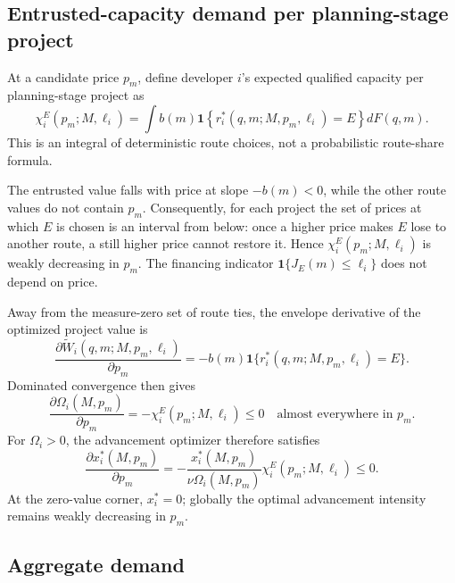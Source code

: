 \subsection{Entrusted-capacity demand per planning-stage project}
\label{subsec:p06-project-demand}

At a candidate price \(p_m\), define developer \(i\)'s expected qualified
capacity per planning-stage project as
\begin{equation}
  \chi_i^E(p_m;M,\ell_i)
  =
  \int
  b(m)
  \mathbf 1
  \left\{
    r_i^*(q,m;M,p_m,\ell_i)=E
  \right\}
  dF(q,m).
  \label{eq:p06-entrusted-capacity}
\end{equation}
This is an integral of deterministic route choices, not a probabilistic
route-share formula.

The entrusted value falls with price at slope \(-b(m)<0\), while the other
route values do not contain \(p_m\). Consequently, for each project the set
of prices at which \(E\) is chosen is an interval from below: once a higher
price makes \(E\) lose to another route, a still higher price cannot restore
it. Hence \(\chi_i^E(p_m;M,\ell_i)\) is weakly decreasing in \(p_m\).
The financing indicator \(\mathbf 1\{J_E(m)\leq\ell_i\}\) does not depend on
price.

Away from the measure-zero set of route ties, the envelope derivative of the
optimized project value is
\[
  \frac{\partial \widetilde W_i(q,m;M,p_m,\ell_i)}{\partial p_m}
  =
  -b(m)
  \mathbf 1\{r_i^*(q,m;M,p_m,\ell_i)=E\}.
\]
Dominated convergence then gives
\begin{equation}
  \frac{\partial\Omega_i(M,p_m)}{\partial p_m}
  =
  -\chi_i^E(p_m;M,\ell_i)
  \leq0
  \quad\text{almost everywhere in }p_m.
  \label{eq:p06-omega-price-envelope}
\end{equation}
For \(\Omega_i>0\), the advancement optimizer therefore satisfies
\begin{equation}
  \frac{\partial x_i^*(M,p_m)}{\partial p_m}
  =
  -\frac{x_i^*(M,p_m)}
  {\nu\Omega_i(M,p_m)}
  \chi_i^E(p_m;M,\ell_i)
  \leq0.
  \label{eq:p06-advancement-price-response}
\end{equation}
At the zero-value corner, \(x_i^*=0\); globally the optimal advancement
intensity remains weakly decreasing in \(p_m\).

\subsection{Aggregate demand}
\label{subsec:p06-demand}

